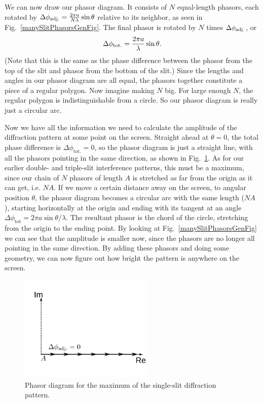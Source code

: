 We can now draw our phasor diagram. It consists of $N$ equal-length
phasors, each rotated by $\Delta\phi_{\rm adj.} = \frac{2\pi
a}{N\lambda}\sin\theta$ relative to its neighbor, as seen in 
Fig.~\ref{manySlitPhasorsGenFig}.  The final phasor is rotated
by $N$ times $\Delta\phi_{\rm adj.}$, or
\begin{equation}
\Delta\phi_{\rm tot.}=\frac{2\pi a}{\lambda}\sin\theta.
\end{equation}
(Note that this is
the same as the phase difference between the phasor from the top of
the slit and phasor from the bottom of the slit.)  Since the lengths
and angles in our phasor diagram are all equal, the phasors together
constitute a piece of a regular polygon.  Now imagine making $N$ big.
For large enough $N$, the regular polygon is indistinguishable from a
circle. So our phasor diagram is really just a circular arc.

Now we have all the information we need to calculate the amplitude of
the diffraction pattern at some point on the screen. Straight ahead at
$\theta=0$, the total phase difference is $\Delta\phi_\text{tot.}= 0$,
so the phasor diagram is just a straight line, with all the phasors
pointing in the same direction, as shown in 
Fig.~\ref{manySlitPhasorsMaxFig}.  As for our earlier double- and
triple-slit interference patterns, this must be a maximum, since our
chain of $N$ phasors of length $A$ is stretched as far from the origin
as it can get, i.e. $NA$.  If we move a certain distance away on the
screen, to angular position $\theta$, the phasor diagram becomes a
circular arc with the same length ($NA$), starting horizontally at the
origin and ending with its tangent at an angle $\Delta \phi_\text{tot}
= 2\pi a\sin\theta/\lambda$.  The resultant phasor is the chord of the
circle, stretching from the origin to the ending point. By looking
at Fig.~\ref{manySlitPhasorsGenFig} we can see that the
amplitude is smaller now, since the phasors are no longer all pointing in the
same direction.  By adding these phasors and doing some geometry, we can
now figure out how bright the pattern is anywhere on the screen.



\begin{figure}
\begin{center}
\includegraphics[width=2.5in]{phasors/manySlitPhasorsMax}
\end{center}
\caption{\label{manySlitPhasorsMaxFig}Phasor diagram for the maximum of the
single-slit diffraction pattern.}
\end{figure}




